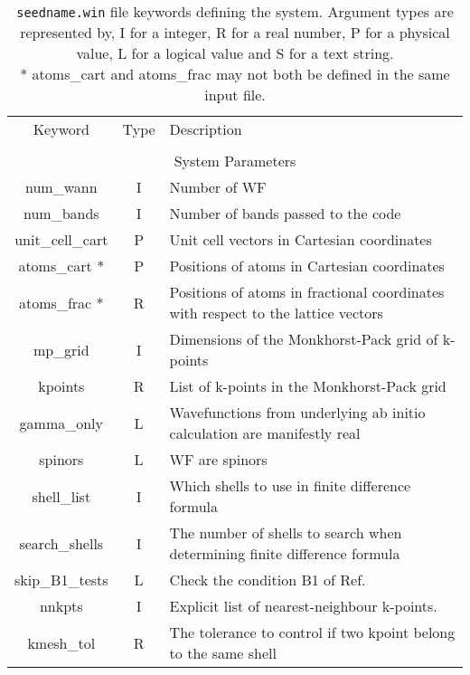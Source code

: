 \begin{table}
\begin{center}
\begin{tabular}{|c|c|p{6cm}|}
\hline
Keyword & Type & Description \\
        &      &             \\
\hline\hline
\multicolumn{3}{|c|}{System Parameters} \\
\hline
{\sc num\_wann }   & I & Number of WF \\
{\sc num\_bands }   & I & Number of bands passed to the code \\
{\sc unit\_cell\_cart }   & P & Unit cell vectors in Cartesian coordinates \\
{\sc atoms\_cart }*   & P & Positions of atoms in Cartesian coordinates \\
{\sc atoms\_frac }*   & R & Positions of atoms in fractional
coordinates with respect to the lattice vectors \\
{\sc mp\_grid }   & I & Dimensions of the Monkhorst-Pack grid of
k-points \\
{\sc kpoints }   & R & List of k-points in the Monkhorst-Pack grid \\
{\sc gamma\_only} & L & Wavefunctions from underlying ab initio
calculation are manifestly real \\
{\sc spinors} & L & WF are spinors \\
{\sc shell\_list }   & I & Which shells to use in finite difference formula \\
{\sc search\_shells }   & I & The number of shells to search when
determining finite difference formula \\
{\sc skip\_B1\_tests }   & L & Check the condition B1 of Ref.~\cite{marzari-prb97}  \\
{\sc nnkpts} & I & Explicit list of nearest-neighbour k-points.\\
{\sc kmesh\_tol } & R & The tolerance to control if two kpoint belong to the same shell \\
\hline
\end{tabular}
\caption[Parameter file keywords controlling system parameters.]
{{\tt seedname.win} file keywords defining the system.  Argument types
are represented by, I for a integer, R for a real number, P for a
physical value, L for a logical value and S for a text string.\\
 {\footnotesize
* {\sc atoms\_cart } and  {\sc atoms\_frac } may not both be defined in
the same input file. }} 
\label{parameter_keywords1}
\end{center}
\end{table}


